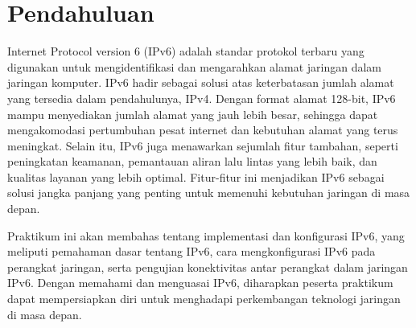\section*{Pendahuluan}

Internet Protocol version 6 (IPv6) adalah standar protokol terbaru yang digunakan untuk mengidentifikasi dan mengarahkan alamat jaringan dalam jaringan komputer. IPv6 hadir sebagai solusi atas keterbatasan jumlah alamat yang tersedia dalam pendahulunya, IPv4. Dengan format alamat 128-bit, IPv6 mampu menyediakan jumlah alamat yang jauh lebih besar, sehingga dapat mengakomodasi pertumbuhan pesat internet dan kebutuhan alamat yang terus meningkat. Selain itu, IPv6 juga menawarkan sejumlah fitur tambahan, seperti peningkatan keamanan, pemantauan aliran lalu lintas yang lebih baik, dan kualitas layanan yang lebih optimal. Fitur-fitur ini menjadikan IPv6 sebagai solusi jangka panjang yang penting untuk memenuhi kebutuhan jaringan di masa depan.

Praktikum ini akan membahas tentang implementasi dan konfigurasi IPv6, yang meliputi pemahaman dasar tentang IPv6, cara mengkonfigurasi IPv6 pada perangkat jaringan, serta pengujian konektivitas antar perangkat dalam jaringan IPv6. Dengan memahami dan menguasai IPv6, diharapkan peserta praktikum dapat mempersiapkan diri untuk menghadapi perkembangan teknologi jaringan di masa depan.
